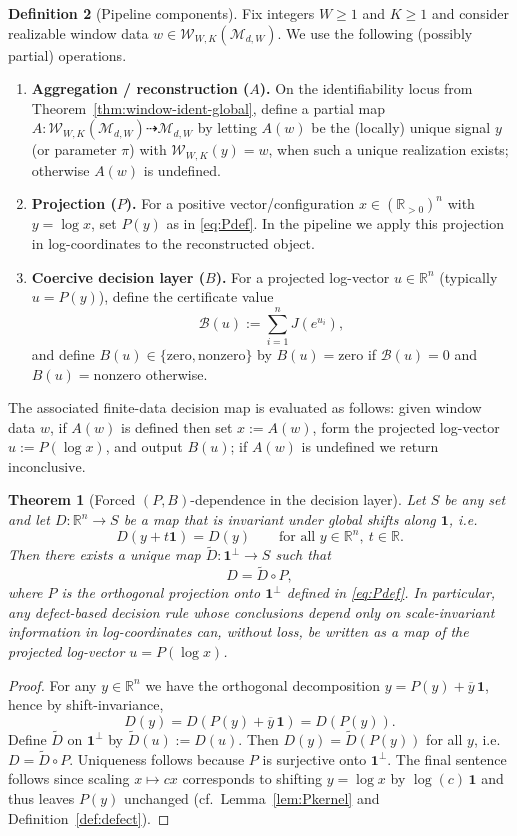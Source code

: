 \documentclass[11pt,reqno]{amsart}
\newtheorem{theorem}{Theorem}[section]
\theoremstyle{definition}
\newtheorem{definition}[theorem]{Definition}
\theoremstyle{remark}
\newcommand{\R}{\mathbb{R}}
\newcommand{\Rp}{\mathbb{R}_{>0}}
\newcommand{\1}{\mathbf{1}}
\newcommand{\avg}[1]{\overline{#1}}
\newcommand{\zero}{\mathrm{zero}}
\newcommand{\nonzero}{\mathrm{nonzero}}
\newcommand{\inconclusive}{\mathrm{inconclusive}}
\begin{document}
\begin{definition}[Pipeline components]\label{def:pipeline-components}
Fix integers $W\ge 1$ and $K\ge 1$ and consider realizable window data $w\in\mathcal{W}_{W,K}(\mathcal{M}_{d,W})$.
We use the following (possibly partial) operations.
\begin{enumerate}[label=\textup{(\alph*)},leftmargin=2.2em]
\item \textbf{Aggregation / reconstruction ($A$).} On the identifiability locus from Theorem~\ref{thm:window-ident-global}, define
a partial map $A:\mathcal{W}_{W,K}(\mathcal{M}_{d,W})\dashrightarrow \mathcal{M}_{d,W}$ by letting $A(w)$ be the (locally) unique
signal $y$ (or parameter $\pi$) with $\mathcal{W}_{W,K}(y)=w$, when such a unique realization exists; otherwise $A(w)$ is undefined.
\item \textbf{Projection ($P$).} For a positive vector/configuration $x\in(\Rp)^n$ with $y=\log x$, set $P(y)$ as in
\eqref{eq:Pdef}. In the pipeline we apply this projection in log-coordinates to the reconstructed object.
\item \textbf{Coercive decision layer ($B$).} For a projected log-vector $u\in\R^n$ (typically $u=P(y)$), define the
certificate value
\[
\mathcal{B}(u):=\sum_{i=1}^n J\!\left(e^{u_i}\right),
\]
and define $B(u)\in\{\zero,\nonzero\}$ by $B(u)=\zero$ if $\mathcal{B}(u)=0$ and $B(u)=\nonzero$ otherwise.
\end{enumerate}
The associated finite-data decision map is evaluated as follows: given window data $w$, if $A(w)$ is defined then set $x:=A(w)$, form the projected log-vector $u:=P(\log x)$, and output $B(u)$; if $A(w)$ is undefined we return $\inconclusive$.

\begin{theorem}[Forced $(P,B)$-dependence in the decision layer]\label{thm:forced-PB}
Let $S$ be any set and let $D:\R^n\to S$ be a map that is invariant under global shifts along $\mathbf 1$, i.e.\
\[
D(y+t\mathbf 1)=D(y)\qquad\text{for all }y\in\R^n,\ t\in\R.
\]
Then there exists a unique map $\widetilde D:\mathbf 1^\perp\to S$ such that
\[
D=\widetilde D\circ P,
\]
where $P$ is the orthogonal projection onto $\mathbf 1^\perp$ defined in \eqref{eq:Pdef}.
In particular, any defect-based decision rule whose conclusions depend only on scale-invariant information in log-coordinates can, without loss, be written as a map of the projected log-vector $u=P(\log x)$.
\end{theorem}

\begin{proof}
For any $y\in\R^n$ we have the orthogonal decomposition $y=P(y)+\avg y\,\mathbf 1$, hence by shift-invariance,
\[
D(y)=D(P(y)+\avg y\,\mathbf 1)=D(P(y)).
\]
Define $\widetilde D$ on $\mathbf 1^\perp$ by $\widetilde D(u):=D(u)$.
Then $D(y)=\widetilde D(P(y))$ for all $y$, i.e.\ $D=\widetilde D\circ P$.
Uniqueness follows because $P$ is surjective onto $\mathbf 1^\perp$.
The final sentence follows since scaling $x\mapsto cx$ corresponds to shifting $y=\log x$ by $\log(c)\,\mathbf 1$ and thus leaves $P(y)$ unchanged (cf.\ Lemma~\ref{lem:Pkernel} and Definition~\ref{def:defect}).
\end{proof}



\end{definition}
\end{document}
